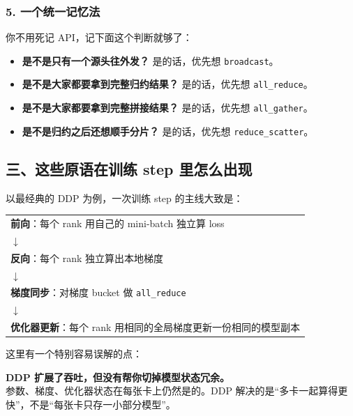 \subsubsection*{5. 一个统一记忆法}

你不用死记 API，记下面这个判断就够了：

\begin{itemize}[leftmargin=1.5em]
  \item \textbf{是不是只有一个源头往外发？} 是的话，优先想 \texttt{broadcast}。
  \item \textbf{是不是大家都要拿到完整归约结果？} 是的话，优先想 \texttt{all\_reduce}。
  \item \textbf{是不是大家都要拿到完整拼接结果？} 是的话，优先想 \texttt{all\_gather}。
  \item \textbf{是不是归约之后还想顺手分片？} 是的话，优先想 \texttt{reduce\_scatter}。
\end{itemize}

\subsection{三、这些原语在训练 step 里怎么出现}

以最经典的 DDP 为例，一次训练 step 的主线大致是：

\begin{center}
\begin{tabular}{p{13.5cm}}
\hline
\textbf{前向}：每个 rank 用自己的 mini-batch 独立算 loss \\
$\downarrow$ \\
\textbf{反向}：每个 rank 独立算出本地梯度 \\
$\downarrow$ \\
\textbf{梯度同步}：对梯度 bucket 做 \texttt{all\_reduce} \\
$\downarrow$ \\
\textbf{优化器更新}：每个 rank 用相同的全局梯度更新一份相同的模型副本 \\
\hline
\end{tabular}
\end{center}

这里有一个特别容易误解的点：

\begin{warnbox}
\textbf{DDP 扩展了吞吐，但没有帮你切掉模型状态冗余。}\\
参数、梯度、优化器状态在每张卡上仍然是的。DDP 解决的是“多卡一起算得更快”，不是“每张卡只存一小部分模型”。
\end{warnbox}

